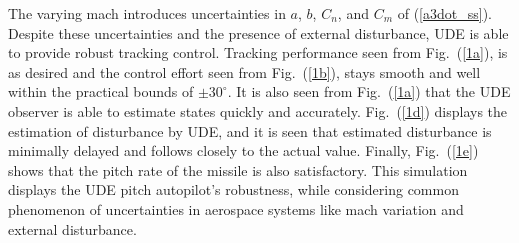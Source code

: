 \documentclass[conference]{IEEEtran}
\begin{document}
		The varying mach introduces uncertainties in $a$, $b$, $C_n$, and $C_m$ of (\ref{a3dot_ss}). Despite these uncertainties and the presence of external disturbance, UDE is able to provide robust tracking control. Tracking performance seen from Fig.~(\ref{1a}), is as desired and the control effort seen from Fig.~(\ref{1b}), stays smooth and well within the practical bounds of  $\pm30^\circ$. It is also seen from Fig.~(\ref{1a}) that the UDE observer is able to estimate states quickly and accurately. Fig.~(\ref{1d}) displays the estimation of disturbance by UDE, and it is seen that estimated disturbance is minimally delayed and follows closely to the actual value. Finally, Fig.~(\ref{1e}) shows that the pitch rate of the missile is also satisfactory. This simulation displays the UDE pitch autopilot's robustness, while considering common phenomenon of uncertainties in aerospace systems like mach variation and external disturbance.

		
\end{document}
